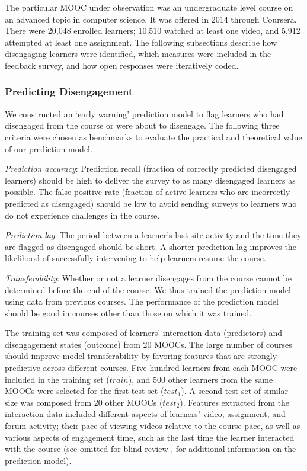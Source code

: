 \documentclass{sigchi}\usepackage[]{graphicx}\usepackage[]{color}
\begin{document}
The particular MOOC under observation was an undergraduate level course on an advanced topic in computer science. It was offered in 2014 through Coursera. There were  20,048 enrolled learners; 10,510 watched at least one video, and 5,912 attempted at least one assignment. The following subsections describe how disengaging learners were identified, which measures were included in the feedback survey, and how open responses were iteratively coded.

\subsubsection{Predicting Disengagement}

We constructed an `early warning' prediction model to flag learners who had disengaged from the course or were about to disengage. The following three criteria were chosen as benchmarks to evaluate the practical and theoretical value of our prediction model.%

\textit{Prediction accuracy}: Prediction recall (fraction of correctly predicted disengaged learners) should be high to deliver the survey to as many disengaged learners as possible. The false positive rate (fraction of active learners who are incorrectly predicted as disengaged) should be low to avoid sending surveys to learners who do not experience challenges in the course.

\textit{Prediction lag}: The period between a learner's last site activity and the time they are flagged as disengaged should be short. A shorter prediction lag improves the likelihood of successfully intervening to help learners resume the course.

\textit{Transferability}: Whether or not a learner disengages from the course cannot be determined before the end of the course. We thus trained the prediction model using data from previous courses. The performance of the prediction model should be good in courses other than those on which it was trained.

The training set was composed of learners' interaction data (predictors) and disengagement states (outcome) from 20 MOOCs. The large number of courses should improve model transferability by favoring features that are strongly predictive across different courses. Five hundred learners from each MOOC were included in the training set ($train$), and 500 other learners from the same MOOCs were selected for the first test set ($test_1$). A second test set of similar size was composed from 20 other MOOCs ($test_2$). Features extracted from the interaction data included different aspects of learners' video, assignment, and forum activity; their pace of viewing videos relative to the course pace, as well as various aspects of engagement time, such as the last time the learner interacted with the course (see omitted for blind review%
, for additional information on the prediction model).
\end{document}
